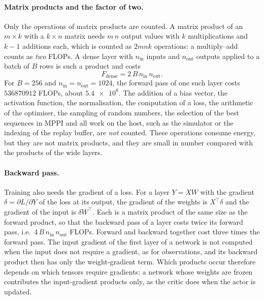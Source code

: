 \paragraph{Matrix products and the factor of two.} Only the operations of matrix products are counted.
A matrix product of an $m \times k$ with a $k \times n$ matrix needs $m\,n$ output values with $k$ multiplications and $k-1$ additions each, which is counted as $2mnk$ operations: a multiply--add counts as \emph{two} FLOPs.
A dense layer with $n_{\mathrm{in}}$ inputs and $n_{\mathrm{out}}$ outputs applied to a batch of $B$ rows is such a product and costs
\begin{equation}
  F_{\mathrm{dense}} = 2\,B\,n_{\mathrm{in}}\,n_{\mathrm{out}} .
  \label{eq:bg-dense}
\end{equation}
For $B = \num{256}$ and $n_{\mathrm{in}} = n_{\mathrm{out}} = \num{1024}$, the forward pass of one such layer costs $\num{536870912}$ FLOPs, about $\num{5.4e8}$.
The addition of a bias vector, the activation function, the normalisation, the computation of a loss, the arithmetic of the optimiser, the sampling of random numbers, the selection of the best sequences in MPPI and all work on the host, such as the simulator or the indexing of the replay buffer, are \emph{not} counted.
These operations consume energy, but they are not matrix products, and they are small in number compared with the products of the wide layers.

\paragraph{Backward pass.} Training also needs the gradient of a loss.
For a layer $Y = XW$ with the gradient $\delta = \partial L / \partial Y$ of the loss at its output, the gradient of the weights is $X^{\top}\delta$ and the gradient of the input is $\delta W^{\top}$.
Each is a matrix product of the same size as the forward product, so that the backward pass of a layer costs twice its forward pass, i.e.\ $4\,B\,n_{\mathrm{in}}\,n_{\mathrm{out}}$ FLOPs.
Forward and backward together cost three times the forward pass.
The input gradient of the first layer of a network is not computed when the input does not require a gradient, as for observations, and its backward product then has only the weight-gradient term.
Which products occur therefore depends on which tensors require gradients: a network whose weights are frozen contributes the input-gradient products only, as the critic does when the actor is updated.

